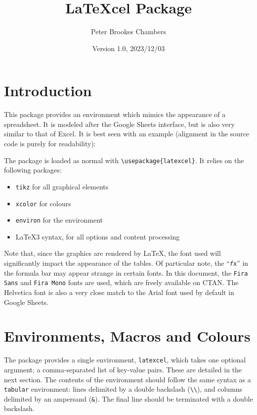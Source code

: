 \documentclass[table]{article}
\title{LaTeXcel Package}
\author{Peter Brookes Chambers}
\date{Version 1.0, 2023/12/03}
\newcommand{\loadexample}[1]{
    \qoinputlisting[mdframed options = {nobreak=true}]{examples/#1.tex}
    \begin{centeredbox}
        
    \end{centeredbox}
}
\newcommand{\semibold}[1]{{\firabook #1}}
\newcommand{\emphasis}[1]{{\color{Red}\semibold{#1}}}
\begin{document}
\maketitle

\tableofcontents

\clearpage

\section{Introduction}

This package provides an environment which mimics the appearance of a spreadsheet. It is modeled after the Google Sheets interface, but is also very similar to that of Excel. It is best seen with an example (alignment in the source code is purely for readability):

\loadexample{full_example}

The package is loaded as normal with \verb|\usepackage{latexcel}|. It relies on the following packages:
\begin{itemize}
    \item \texttt{tikz} for all graphical elements
    \item \texttt{xcolor} for colours
    \item \texttt{environ} for the environment
    \item \LaTeX3 syntax, for all options and content processing
\end{itemize}

Note that, since the graphics are rendered by \LaTeX, the font used will significantly impact the appearance of the tables. Of particular note, the ``{\texttt{\textit{\selectfont f}}\hspace{-0.5ex}\texttt{\selectfont x}}'' in the formula bar may appear strange in certain fonts. In this document, the \texttt{Fira Sans} and \texttt{Fira Mono} fonts are used, which are freely available on CTAN. The Helvetica font is also a very close match to the Arial font used by default in Google Sheets.

\section{Environments, Macros and Colours}

The package provides a single environment, \verb|latexcel|, which takes one optional argument; a comma-separated list of key-value pairs. These are detailed in the next section. The contents of the environment should follow the same syntax as a \texttt{tabular} environment: lines delimited by a double backslash (\verb|\\|), and columns delimited by an ampersand (\verb|&|). The final line should \emphasis{not} be terminated with a double backslash.
\end{document}
